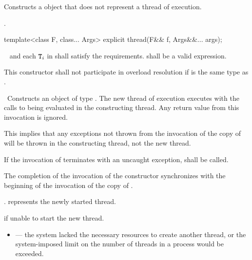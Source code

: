 \begin{itemdescr}
\pnum\effects Constructs a  object that does not represent a thread of execution.

\pnum\postconditions {}.
\end{itemdescr}

%
\begin{itemdecl}
template<class F, class... Args> explicit thread(F&& f, Args&&... args);
\end{itemdecl}

\begin{itemdescr}
\pnum
\requires\  and each $\texttt{T}_i$ in  shall satisfy the
 requirements.
 shall be
a va\-lid expression.

\pnum
\remarks
This constructor shall not participate in overload resolution if 
is the same type as .

\pnum
\effects\ Constructs an object of type . The new thread of execution executes
 with the calls to
 being evaluated in the constructing thread. Any return value from this invocation
is ignored. \begin{note} This implies that any exceptions not thrown from the invocation of the copy
of  will be thrown in the constructing thread, not the new thread. \end{note} If the
invocation of
termi\-nates with an uncaught exception,  shall be called.


\pnum\sync The completion of the invocation of the constructor
synchronizes with the beginning of the invocation of the copy of .

\pnum\postconditions {}.  represents the newly started thread.

\pnum\throws {} if unable to start the new thread.

\pnum\errors
\begin{itemize}
\item {} --- the system lacked the necessary
resources to create another thread, or the system-imposed limit on the number of
threads in a process would be exceeded.
\end{itemize}
\end{itemdescr}

